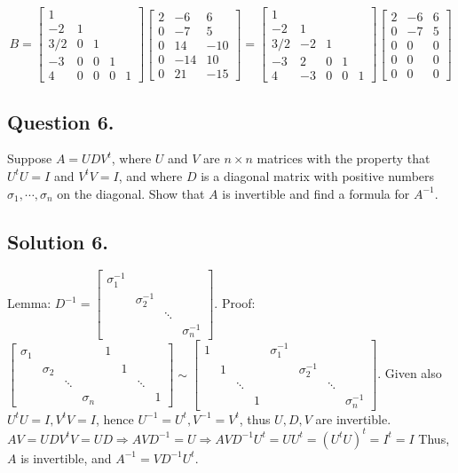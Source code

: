 \documentclass{article}
\begin{document}
\[B=\left[\begin{array}{rrrrr}1\\-2&1\\3/2&0&1\\-3&0&0&1\\4&0&0&0&1\end{array}\right]\left[\begin{array}{rrr}2&-6&6\\0&-7&5\\0&14&-10\\0&-14&10\\0&21&-15\end{array}\right]=\left[\begin{array}{rrrrr}1\\-2&1\\3/2&-2&1\\-3&2&0&1\\4&-3&0&0&1\end{array}\right]\left[\begin{array}{rrr}2&-6&6\\0&-7&5\\0&0&0\\0&0&0\\0&0&0\end{array}\right]\]
\subsection*{Question 6.}
Suppose $A=UDV^t$, where $U$ and $V$ are $n\times n$ matrices with the property that $U^tU=I$ and $V^tV=I$, and where $D$ is a diagonal matrix with positive numbers $\sigma_1,\cdots,\sigma_n$ on the diagonal. Show that $A$ is invertible and find a formula for $A^{-1}$.
\subsection*{Solution 6.}
Lemma: $D^{-1}=\left[\begin{array}{rrrr}\sigma_1^{-1}\\&\sigma_2^{-1}\\&&\ddots\\&&&\sigma_n^{-1}\end{array}\right]$.\newline
Proof: $\left[\begin{array}{rrrrrrrr}\sigma_1&&&&1\\&\sigma_2&&&&1\\&&\ddots&&&&\ddots\\&&&\sigma_n&&&&1\end{array}\right]\sim \left[\begin{array}{rrrrrrrr}1&&&&\sigma_1^{-1}\\&1&&&&\sigma_2^{-1}\\&&\ddots&&&&\ddots\\&&&1&&&&\sigma_n^{-1}\end{array}\right]$.\newline
Given also $U^tU=I,V^tV=I$, hence $U^{-1}=U^t,V^{-1}=V^t$, thus $U,D,V$ are invertible.\newline
$AV=UDV^tV=UD \Rightarrow AVD^{-1}=U\Rightarrow AVD^{-1}U^t=UU^t=(U^tU)^t=I^t=I$\newline
Thus, $A$ is invertible, and $A^{-1}=VD^{-1}U^t$.
\end{document}
